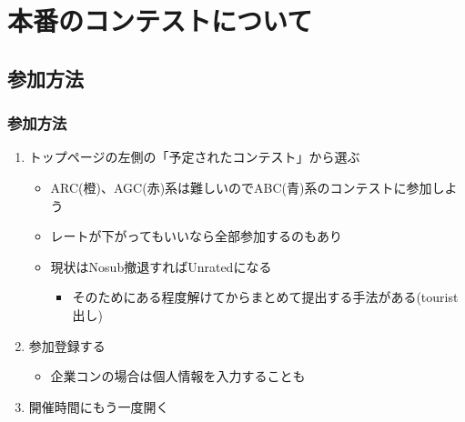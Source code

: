 \documentclass[t, aspectratio=169, dvipdfmx]{beamer}
\begin{document}
\section{本番のコンテストについて}
\frame{\sectionpage}

\subsection{参加方法}
\begin{frame}
  \frametitle{参加方法}
  \begin{enumerate}
    \item トップページの左側の「予定されたコンテスト」から選ぶ
    \begin{itemize}
      \item ARC(橙)、AGC(赤)系は難しいのでABC(青)系のコンテストに参加しよう
      \item レートが下がってもいいなら全部参加するのもあり
      \item 現状はNosub撤退すればUnratedになる
      \begin{itemize}
        \item そのためにある程度解けてからまとめて提出する手法がある(tourist出し)
      \end{itemize}
    \end{itemize}
    \item 参加登録する
    \begin{itemize}
      \item 企業コンの場合は個人情報を入力することも
    \end{itemize}
    \item 開催時間にもう一度開く
  \end{enumerate}
\end{frame}
\end{document}
